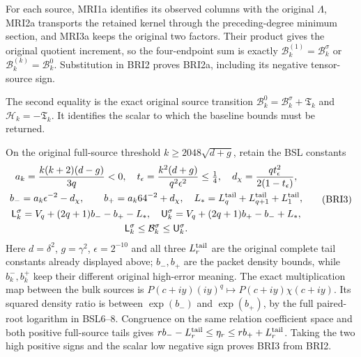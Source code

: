 \documentclass[11pt,a4paper]{article}
\begin{document}
For each source, MRI1a identifies its observed columns with
the original $\Lambda$, MRI2a transports the retained kernel
through the preceding-degree minimum section, and MRI3a keeps
the original two factors. Their product gives the original
quotient increment, so the four-endpoint sum is exactly
$\mathcal B_k^{(1)}=\mathcal B_k^\sigma$ or
$\mathcal B_k^{(k)}=\mathcal B_k^0$. Substitution in BRI2
proves BRI2a, including its negative tensor-source sign.

The second equality is the exact original source transition
$\mathcal B_k^0=\mathcal B_k^\sigma+\mathfrak T_k$ and
$\mathcal H_k=-\mathfrak T_k$. It identifies the scalar to
which the baseline bounds must be returned.

On the original full-source threshold
$k\geq2048\sqrt{d+g}$, retain the BSL constants
\[
\begin{gathered}
 a_k=\frac{k(k+2)(d-g)}{3q}<0,\quad
 t_\epsilon=\frac{k^2(d+g)}{q^2\epsilon^2}\leq\tfrac14,
 \quad d_\chi=\frac{qt_\epsilon^2}{2(1-t_\epsilon)},\\
 b_-=a_k\epsilon^{-2}-d_\chi,
 \qquad b_+=a_k64^{-2}+d_\chi,
 \quad L_*=L_q^{\rm tail}+L_{q+1}^{\rm tail}+L_1^{\rm tail},\\
 \mathsf L_k^\sigma=V_q+(2q+1)b_- -b_+-L_*,\quad
 \mathsf U_k^\sigma=V_q+(2q+1)b_+ -b_-+L_*,\\
 \mathsf L_k^\sigma\leq\mathcal B_k^\sigma
                                  \leq\mathsf U_k^\sigma.
\end{gathered}\tag{BRI3}
\]
Here $d=\delta^2$, $g=\gamma^2$, $\epsilon=2^{-10}$ and
all three $L_r^{\rm tail}$ are the original complete tail constants
already displayed above; $b_-,b_+$ are the packet density bounds,
while $b_k^-,b_k^+$ keep their different original high-error meaning.
The exact multiplication map between the bulk sources is
$P(c+iy)(iy)^q\mapsto P(c+iy)\chi(c+iy)$.
Its squared density ratio is between $\exp(b_-)$ and
$\exp(b_+)$, by the full paired-root logarithm in BSL6--8.
Congruence on the same relation coefficient space and both positive
full-source tails gives $rb_- -L_r^{\rm tail}\leq\eta_r
\leq rb_++L_r^{\rm tail}$. Taking the two high positive signs
and the scalar low negative sign proves BRI3 from BRI2.
\end{document}
